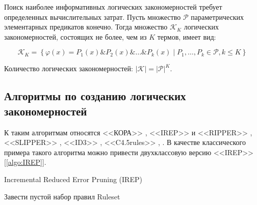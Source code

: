 \documentclass[12pt]{article}
\begin{document}


Поиск наиболее информативных логических закономерностей требует
определенных вычислительных затрат. Пусть множество \(\mathcal{P}\)
параметрических элементарных предикатов конечно. Тогда множество
\(\mathcal{K}_K\) логических закономерностей, состоящих не более, чем
из \(K\) термов, имеет вид:

\[
\mathcal{K}_K =
\left\{
 \varphi(x) = P_1(x) \& P_2(x) \& \dots \& P_k(x) \mid
  P_1, \dots, P_k \in \mathcal{P}, k \leq K
\right\}
\]

Количество логических закономерностей: \(\lvert \mathcal{K} \rvert =
\lvert \mathcal{P} \rvert^{K}\).

\subsection{Алгоритмы по созданию логических закономерностей}

К таким алгоритмам относятся <<КОРА>> \cite{vainzvaig73kora}, <<IREP>>
и <<RIPPER>> \cite{cohen95fast}, <<SLIPPER>> \cite{cohen99simple},
<<ID3>> \cite{quinlan86induction}, <<C4.5rules>>
\cite{quinlan93programs}, \cite{quinlan96bagging}.  В качестве
классического примера такого алгоритма можно привести двухклассовую
версию <<IREP>> [\ref{algo:IREP}].

\begin{algorithm}[!htpb]
  \caption{Incremental Reduced Error Pruning (IREP)}\label{algo:IREP}
   {
    Завести пустой набор правил Ruleset\;
    \;
  }
\end{algorithm}
\end{document}
